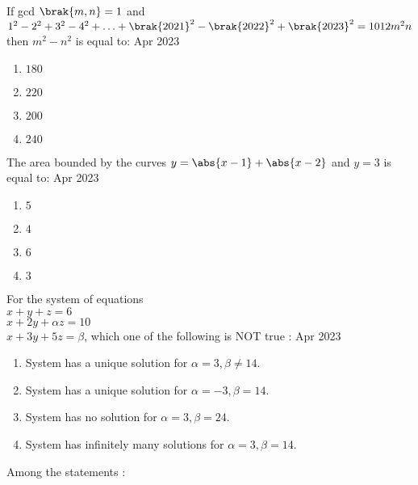\iffalse
\title{Assignment}
\author{AI24BTECH11020}
\section{mcq-single}
\fi

	\item If gcd $\brak{m, n} = 1$ and $1^2 - 2^2 + 3^2 - 4^2 + \ldots + \brak{2021}^2 - \brak{2022}^2 + \brak{2023}^2 = 1012 m^2n$ then $m^2 - n^2$ is equal to: \hfill{Apr 2023}
    \begin{enumerate}
        \item $180$
        \item $220$
        \item $200$
        \item $240$
    \end{enumerate}
\item The area bounded by the curves $y = \abs{ x - 1 } + \abs{ x - 2} $ and $y = 3$ is equal to: \hfill{Apr 2023}
    \begin{enumerate}
        \item $5$
        \item $4$
        \item $6$
        \item $3$
    \end{enumerate}                                   
\item For the system of equations \\                  
          $x+y+z=6$\\ $x+2y+ \alpha z=10 $ \\ $x+3y+5z=\beta $, which one of the following is NOT true : \hfill{Apr 2023}                                  
    \begin{enumerate}                                                            
        \item System has a unique solution for $\alpha =3, \beta \neq 14.$                                   \item System has a unique solution for $\alpha = -3, \beta =14.$ 
        \item System has no solution for $\alpha =3, \beta =24.$ 
        \item System has infinitely many solutions for $\alpha =3, \beta =14.$                       
    \end{enumerate}                       
\item Among the statements : \\      
